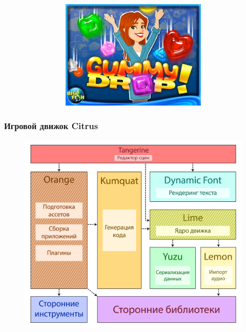 \documentclass[10pt, unicode]{beamer}
\begin{document}
\begin{frame}
\begin{figure}[H]
\begin{subfigure}{0.49\linewidth}
\begin{subfigure}{\linewidth}
                    \includegraphics[scale=0.260]{GD.jpg}
                \end{subfigure}
            \end{subfigure}
        \end{figure}
    \end{frame}
    \begin{frame}
        \frametitle{Игровой движок Citrus}
        \begin{figure}
            \centering
            \includegraphics[width=\linewidth, height=.9\textheight, keepaspectratio]{CtrusArchitecture2.png}
        \end{figure}
    \end{frame}
\end{document}
